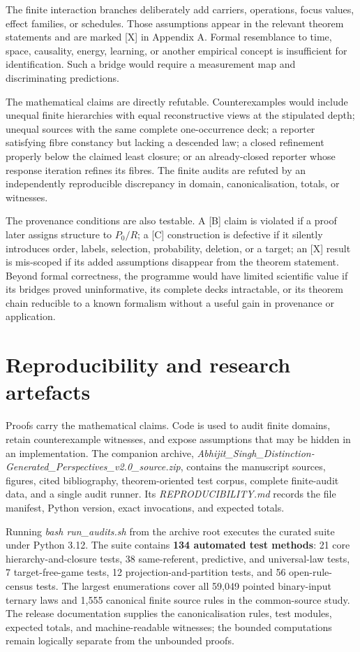 \documentclass[11pt,a4paper]{article}
\begin{document}
The finite interaction branches deliberately add carriers, operations,
focus values, effect families, or schedules. Those assumptions appear in
the relevant theorem statements and are marked {[}X{]} in Appendix A.
Formal resemblance to time, space, causality, energy, learning, or
another empirical concept is insufficient for identification. Such a
bridge would require a measurement map and discriminating predictions.

The mathematical claims are directly refutable. Counterexamples would
include unequal finite hierarchies with equal reconstructive views at
the stipulated depth; unequal sources with the same complete
one-occurrence deck; a reporter satisfying fibre constancy but lacking a
descended law; a closed refinement properly below the claimed least
closure; or an already-closed reporter whose response iteration refines
its fibres. The finite audits are refuted by an independently
reproducible discrepancy in domain, canonicalisation, totals, or
witnesses.

The provenance conditions are also testable. A {[}B{]} claim is violated
if a proof later assigns structure to \(P_{0}/R\); a {[}C{]}
construction is defective if it silently introduces order, labels,
selection, probability, deletion, or a target; an {[}X{]} result is
mis-scoped if its added assumptions disappear from the theorem
statement. Beyond formal correctness, the programme would have limited
scientific value if its bridges proved uninformative, its complete decks
intractable, or its theorem chain reducible to a known formalism without
a useful gain in provenance or application.

\section{Reproducibility and research
artefacts}

Proofs carry the mathematical claims. Code is used to audit finite
domains, retain counterexample witnesses, and expose assumptions that
may be hidden in an implementation. The companion archive,
\emph{Abhijit\_Singh\_Distinction-Generated\_Perspectives\_v2.0\_source.zip},
contains the manuscript sources, figures, cited bibliography,
theorem-oriented test corpus, complete finite-audit data, and a single
audit runner. Its \emph{REPRODUCIBILITY.md} records the file manifest,
Python version, exact invocations, and expected totals.

Running \emph{bash run\_audits.sh} from the archive root executes the
curated suite under Python 3.12. The suite contains \textbf{134
automated test methods}: 21 core hierarchy-and-closure tests, 38
same-referent, predictive, and universal-law tests, 7 target-free-game
tests, 12 projection-and-partition tests, and 56 open-rule-census tests.
The largest enumerations cover all 59,049 pointed binary-input ternary
laws and 1,555 canonical finite source rules in the common-source study.
The release documentation supplies the canonicalisation rules, test
modules, expected totals, and machine-readable witnesses; the bounded
computations remain logically separate from the unbounded proofs.
\end{document}
